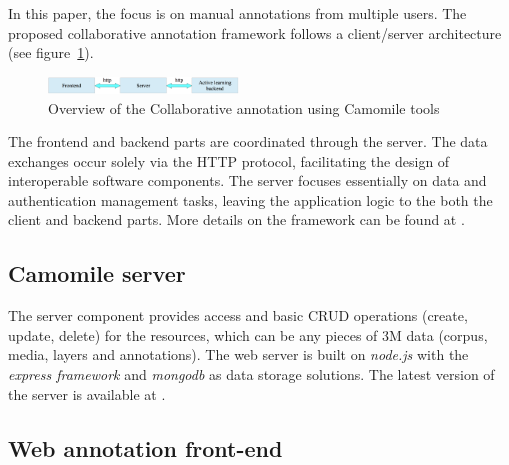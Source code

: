 \documentclass[a4paper]{article}
\begin{document}
In this paper, the focus is on manual annotations from multiple users. The proposed collaborative annotation framework follows a client/server architecture (see figure~\ref{fig:overview}). 

\begin{figure}[h]
 	\includegraphics[width=0.45\textwidth]{overview.png}
	\caption{Overview of the Collaborative annotation using Camomile tools}
	\label{fig:overview}
\end{figure}

The frontend and backend parts are coordinated through the server. The data exchanges occur solely via the HTTP protocol, facilitating the design of interoperable software components. The server focuses essentially on data and authentication management tasks, leaving the application logic to the both the client and backend parts. More details on the framework can be found at \cite{urlframework}.


      \subsection{Camomile server}

The server component provides access and basic CRUD operations (create, update, delete) for the resources, which can be any pieces of 3M data (corpus, media, layers and annotations). The web server is built on \textit{node.js} with the \textit{express framework} and \textit{mongodb} as data storage solutions. The latest version of the server is available at \cite{urlgithub}. 

        \vspace{-0.3cm}
      \subsection{Web annotation front-end}
        \vspace{-0.5cm}
\end{document}
